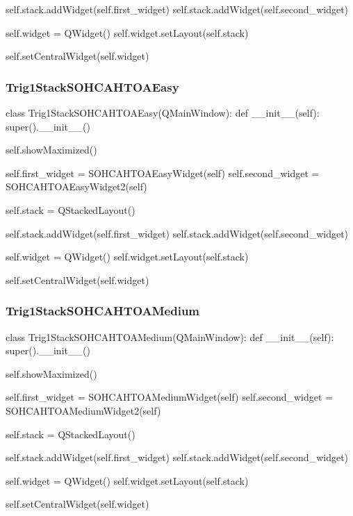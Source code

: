 \begin{landscape}
\begin{python}
        self.stack.addWidget(self.first_widget)
        self.stack.addWidget(self.second_widget)

        self.widget = QWidget()
        self.widget.setLayout(self.stack)

        self.setCentralWidget(self.widget)
\end{python}

\subsubsection{Trig1StackSOHCAHTOAEasy}

\begin{python}
class Trig1StackSOHCAHTOAEasy(QMainWindow):
    def __init__(self):
        super().__init__()

        self.showMaximized()

        self.first_widget = SOHCAHTOAEasyWidget(self)
        self.second_widget = SOHCAHTOAEasyWidget2(self)

        self.stack = QStackedLayout()

        self.stack.addWidget(self.first_widget)
        self.stack.addWidget(self.second_widget)

        self.widget = QWidget()
        self.widget.setLayout(self.stack)

        self.setCentralWidget(self.widget)
\end{python}

\subsubsection{Trig1StackSOHCAHTOAMedium}

\begin{python}
class Trig1StackSOHCAHTOAMedium(QMainWindow):
    def __init__(self):
        super().__init__()

        self.showMaximized()

        self.first_widget = SOHCAHTOAMediumWidget(self)
        self.second_widget = SOHCAHTOAMediumWidget2(self)

        self.stack = QStackedLayout()

        self.stack.addWidget(self.first_widget)
        self.stack.addWidget(self.second_widget)

        self.widget = QWidget()
        self.widget.setLayout(self.stack)

        self.setCentralWidget(self.widget)
\end{python}


\end{landscape}
